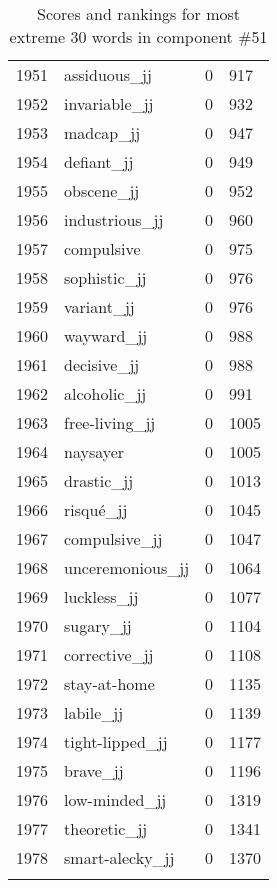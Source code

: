 \begin{longtable}[!htbp]{| rlr@{.}l |}
    1951 & assiduous\_jj & 0 & 917 \\
    1952 & invariable\_jj & 0 & 932 \\
    1953 & madcap\_jj & 0 & 947 \\
    1954 & defiant\_jj & 0 & 949 \\
    1955 & obscene\_jj & 0 & 952 \\
    1956 & industrious\_jj & 0 & 960 \\
    1957 & compulsive & 0 & 975 \\
    1958 & sophistic\_jj & 0 & 976 \\
    1959 & variant\_jj & 0 & 976 \\
    1960 & wayward\_jj & 0 & 988 \\
    1961 & decisive\_jj & 0 & 988 \\
    1962 & alcoholic\_jj & 0 & 991 \\
    1963 & free-living\_jj & 0 & 1005 \\
    1964 & naysayer & 0 & 1005 \\
    1965 & drastic\_jj & 0 & 1013 \\
    1966 & risqué\_jj & 0 & 1045 \\
    1967 & compulsive\_jj & 0 & 1047 \\
    1968 & unceremonious\_jj & 0 & 1064 \\
    1969 & luckless\_jj & 0 & 1077 \\
    1970 & sugary\_jj & 0 & 1104 \\
    1971 & corrective\_jj & 0 & 1108 \\
    1972 & stay-at-home & 0 & 1135 \\
    1973 & labile\_jj & 0 & 1139 \\
    1974 & tight-lipped\_jj & 0 & 1177 \\
    1975 & brave\_jj & 0 & 1196 \\
    1976 & low-minded\_jj & 0 & 1319 \\
    1977 & theoretic\_jj & 0 & 1341 \\
    1978 & smart-alecky\_jj & 0 & 1370 \\
    \hline
    \caption{Scores and rankings for most extreme 30 words in component \#51} \\
\end{longtable}
